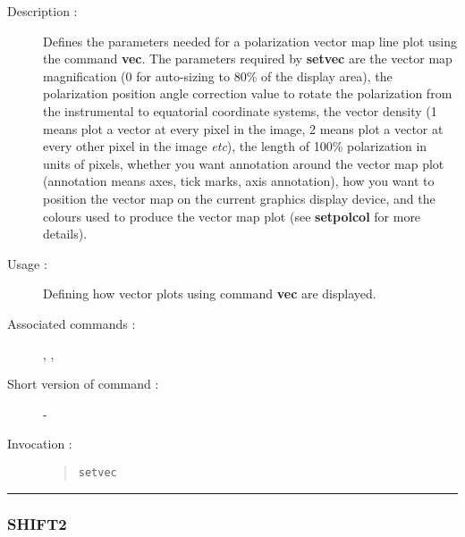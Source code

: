 \begin{description}

\item[Description :] Defines the parameters needed for a polarization
vector map line plot using the command {\bf vec}.  The parameters
required by {\bf setvec} are the vector map magnification (0 for
auto-sizing to 80\% of the display area), the polarization position
angle correction value to rotate the polarization from the instrumental
to equatorial coordinate systems, the vector density (1 means plot a
vector at every pixel in the image, 2 means plot a vector at every
other pixel in the image \emph{etc}), the length of 100\% polarization
in units of pixels, whether you want annotation around the vector map
plot (annotation means axes, tick marks, axis annotation), how you want
to position the vector map on the current graphics display device, and
the colours used to produce the vector map plot (see {\bf setpolcol}
for more details).

\item[Usage :] Defining how vector plots using command {\bf vec} are displayed.

\item[Associated commands :] {\tt {}}, 
{\tt {}}, {\tt {}}

\item[Short version of command :] -
\item[Invocation :]

\begin{quote}{\tt  setvec }\end{quote}

\end{description}

\hrule 
\subsubsection*{\label{SHIFT2}SHIFT2}

